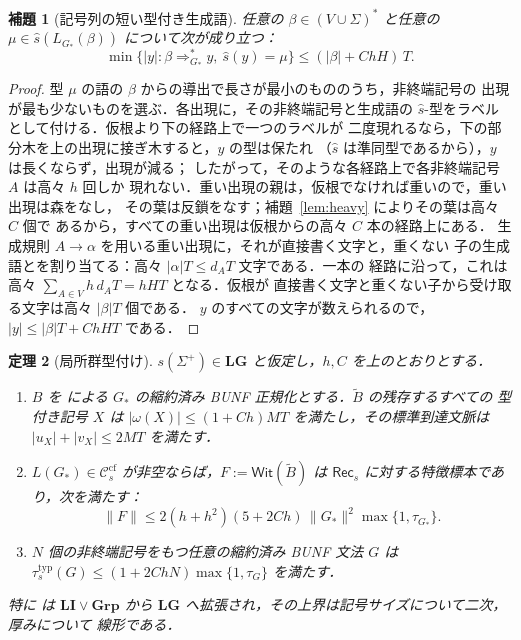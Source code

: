 \documentclass[11pt,a4paper]{ltjsarticle}
\numberwithin{equation}{section}
\theoremstyle{plain}
\newtheorem{theorem}{定理}[section]
\newtheorem{lemma}[theorem]{補題}
\theoremstyle{definition}
\theoremstyle{remark}
\theoremstyle{plain}
\newcommand{\cf}{\mathrm{cf}}
\newcommand{\Ccf}[1]{\mathcal C_{#1}^{\cf}}
\newcommand{\Rec}{\mathsf{Rec}}
\newcommand{\WitnessSet}{\mathsf{Wit}}
\newcommand{\LG}{\mathbf{LG}}
\begin{document}
\begin{lemma}[記号列の短い型付き生成語]
\label{lem:typed-strings}
任意の $\beta\in(V\cup\Sigma)^*$ と任意の
$\mu\in\widehat s(L_{G_*}(\beta))$ について次が成り立つ：
\[
 \min\{|y|:\beta\Rightarrow_{G_*}^*y,\ \widehat s(y)=\mu\}\le(|\beta|+ChH)\,T.
\]
\end{lemma}

\begin{proof}
型 $\mu$ の語の $\beta$ からの導出で長さが最小のもののうち，非終端記号の
出現が最も少ないものを選ぶ．各出現に，その非終端記号と生成語の
$\widehat s$-型をラベルとして付ける．仮根より下の経路上で一つのラベルが
二度現れるなら，下の部分木を上の出現に接ぎ木すると，$y$ の型は保たれ
（$\widehat s$ は準同型であるから），$y$ は長くならず，出現が減る；
したがって，そのような各経路上で各非終端記号 $A$ は高々 $h$ 回しか
現れない．重い出現の親は，仮根でなければ重いので，重い出現は森をなし，
その葉は反鎖をなす；補題~\ref{lem:heavy} によりその葉は高々 $C$ 個で
あるから，すべての重い出現は仮根からの高々 $C$ 本の経路上にある．
生成規則 $A\to\alpha$ を用いる重い出現に，それが直接書く文字と，重くない
子の生成語とを割り当てる：高々 $|\alpha|T\le d_AT$ 文字である．一本の
経路に沿って，これは高々 $\sum_{A\in V}h\,d_AT=hHT$ となる．仮根が
直接書く文字と重くない子から受け取る文字は高々 $|\beta|T$ 個である．
$y$ のすべての文字が数えられるので，$|y|\le|\beta|T+ChHT$ である．
\end{proof}

\begin{theorem}[局所群型付け]
\label{thm:lg-sufficiency}
$s(\Sigma^+)\in\LG$ と仮定し，$h,C$ を上のとおりとする．
\begin{enumerate}[label=\textup{(\roman*)},leftmargin=*]
\item $B$ を \cite[命題~7.3 および付録~A.2]{kuriyamaCFG} による
$G_*$ の縮約済み BUNF 正規化とする．$\widetilde B$ の残存するすべての
型付き記号 $X$ は $|\omega(X)|\le(1+Ch)MT$ を満たし，その標準到達文脈は
$|u_X|+|v_X|\le2MT$ を満たす．
\item $L(G_*)\in\Ccf{s}$ が非空ならば，$F:=\WitnessSet(\widetilde B)$ は
$\Rec_s$ に対する特徴標本であり，次を満たす：
\[
 \|F\|\le2(h+h^2)(5+2Ch)\,\|G_*\|^2\max\{1,\tau_{G_*}\}.
\]
\item $N$ 個の非終端記号をもつ任意の縮約済み BUNF 文法 $G$ は
$\tau^{\mathrm{typ}}_s(G)\le(1+2ChN)\max\{1,\tau_G\}$ を満たす．
\end{enumerate}
特に \cite[系~7.5]{kuriyamaCFG} は $\mathbf{LI}\vee\mathbf{Grp}$ から
$\LG$ へ拡張され，その上界は記号サイズについて二次，厚みについて
線形である．
\end{theorem}
\end{document}
